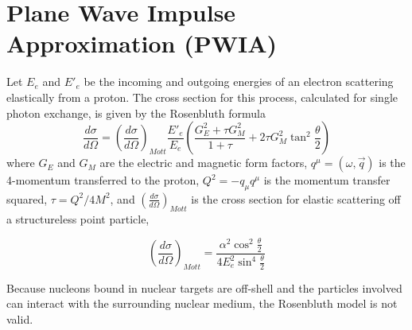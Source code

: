 \section{Plane Wave Impulse Approximation (PWIA)}

Let $E_e$ and $E'_e$ be the incoming and outgoing energies of an electron
scattering elastically from a proton.
The cross section for this process, calculated for single photon exchange,
is given by the Rosenbluth formula
\begin{equation}
\frac{d\sigma}{d\Omega} = \left( \frac{d\sigma}{d\Omega} \right)_{Mott}
                          \frac{E'_e}{E_e}
                          \left(
                                \frac{G_E^2 + \tau G_M^2}{1+\tau} +
                                2 \tau G_M^2 \tan^2 \frac{\theta}{2}
                          \right)
\end{equation}
where
$G_E$ and $G_M$ are the electric and magnetic form factors,
$q^\mu=(\omega,\vec{q})$ is the 4-momentum transferred to the proton,
$Q^2=-q_\mu q^\mu$ is the momentum transfer squared,
$\tau=Q^2/4M^2$,
and $\left( \frac{d\sigma}{d\Omega} \right)_{Mott}$ is the cross section for
elastic scattering off a structureless point particle,

\begin{equation}
    \left( \frac{d\sigma}{d\Omega} \right)_{Mott} =
                    \frac{\alpha^2 \cos^2 \frac{\theta}{2}}
                         {4E_e^2 \sin^4 \frac{\theta}{2}}
\end{equation}

Because nucleons bound in nuclear targets are off-shell and the particles
involved can interact with the surrounding nuclear medium, the Rosenbluth model
is not valid.

